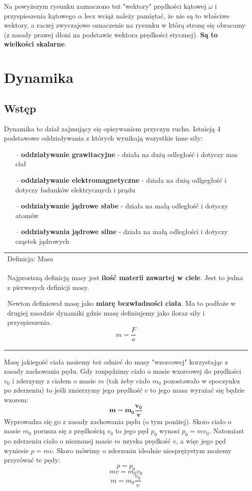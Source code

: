 \documentclass[a4paper]{article}
\newenvironment{definition}[2][Definicja]
    {
        \begin{center}
        \begin{tabular}{|p{1\textwidth}|}
        \hline
            #1: #2\\[2ex]
        \begin{em}
        \Large
    }
    { 
        \end{em}
        \\\hline
        \end{tabular} 
        \end{center}
    }
\begin{document}
    Na powyższym rysunku zaznaczono też "wektory" prędkości kątowej $\omega$ i przyspieszenia kątowego $\alpha$
    lecz wciąż należy pamiętać, że nie są to właściwe wektory, a raczej zwyczajowe oznaczenie na rysunku 
    w którą stronę się obracamy (z zasady prawej dłoni na podstawie wektora prędkości stycznej). 
    \textbf{Są to wielkości skalarne}. 
    \pagebreak
    
    \section{\huge Dynamika}
    \subsection{\LARGE Wstęp}
    \Large
    Dynamika to dział zajmujący się opisywaniem przyczyn ruchu. Istnieją 4 podstawowe oddziaływania z 
    których wynikają wszystkie inne siły:
    \begin{itemize}
        \item [--] \textbf{oddziaływanie grawitacyjne} - działa na dużą odległość i dotyczy mas ciał
        \item [--] \textbf{oddziaływanie elektromagnetyczne} - działa na dużą odlgegłość i dotyczy ładunków elektrycznych i prądu
        \item [--] \textbf{oddziaływanie jądrowe słabe} - działa na małą odległość i dotyczy atomów
        \item [--] \textbf{oddziaływania jądrowe silne} - działa na małą odległości i dotyczy cząstek jądrowych
    \end{itemize}
    
    \begin{definition}{Masa}
        Najprostszą definicją masy jest \textbf{ilość materii zawartej w ciele}. Jest to jedna z 
        pierwszych definicji masy.
        
        Newton definiował masę jako \textbf{miarę bezwładności ciała}. Ma to podłoże w 
        drugiej zasadzie dynamiki gdzie masę definiujemy jako iloraz siły i przyspieszenia.
        \[m = \frac{F}{a}\]
    \end{definition}  
    Masę jakiegość ciała możemy też odnieć do masy "wzorcowej" korzystając z zasady
    zachowania pędu. Gdy rozpędzimy ciało o masie wzorcowej do prędkości $v_0$ i zderzymy
    z ciałem o masie $m$ (tak żeby ciało $m_0$ pozostawało w spoczynku po zderzeniu) to jeśli
    zmierzymy jego prędkość $v$ to jego masa wyrażać się będzie wzorem:
    \[\mathbf{m = m_0\frac{v_0}{v}}\]
    Wyprowadza się go z zasady zachowania pędu (o tym poniżej). Skoro ciało o masie $m_0$ 
    porusza się z prędkością $v_0$ to jego pęd $p_0$ wynosi $p_0 = mv_0$. Natomiast po zderzeniu
    ciało o nieznanej masie $m$ uzyska prędkość $v$, a więc jego pęd wyniesie $p = mv$.
    Skoro mówimy o zderzeniu idealnie niesprężystym możemy przyrówać te pędy:
    \[ p = p_0\]
    \[ mv = m_0v_0\]
    \[ m = m_0 \frac{v_0}{v}\]
\end{document}
